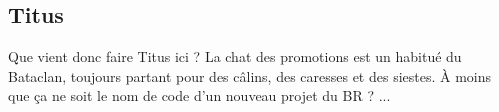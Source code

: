 \subsection{Titus}

\label{titus}
Que vient donc faire Titus ici ? La chat des promotions est un habitué du Bataclan, toujours partant pour des câlins, des caresses et des siestes. À moins que ça ne soit le nom de code d'un nouveau projet du BR ? ...